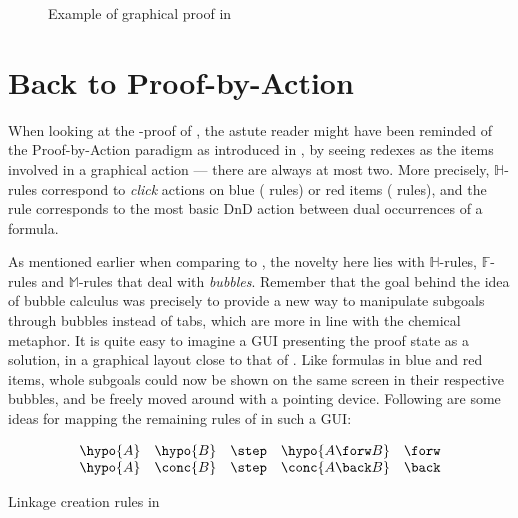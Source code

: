 \begin{figure*}
  
  \caption{Example of graphical proof in }
\end{figure*}

\section{Back to Proof-by-Action}

When looking at the -proof of , the astute reader
might have been reminded of the Proof-by-Action paradigm as introduced in
, by seeing redexes as the items involved in a graphical action ---
there are always at most two. More precisely, $\mathbb{H}$-rules correspond to
\emph{click} actions on blue ({\rnm{\mcirc{-}}} rules) or red items
({\rnm{\mcirc{+}}} rules), and the {} rule corresponds to
the most basic DnD action between dual occurrences of a formula.

As mentioned earlier when comparing  to , the novelty here lies
with $\mathbb{H}$-rules, $\mathbb{F}$-rules and $\mathbb{M}$-rules that deal
with \emph{bubbles}. Remember that the goal behind the idea of bubble calculus
was precisely to provide a new way to manipulate subgoals through bubbles
instead of tabs, which are more in line with the chemical metaphor. It is quite
easy to imagine a GUI presenting the proof state as a solution, in a graphical
layout close to that of . Like formulas in blue and red
items, whole subgoals could now be shown on the same screen in their respective
bubbles, and be freely moved around with a pointing device. Following are some
ideas for mapping the remaining rules of  in such a GUI:

\begin{marginfigure}
  $$
  \begin{array}{rcll}
    \hypo{A}~~~\hypo{B} &\step &\hypo{A \forw B} &\forw \\
    \hypo{A}~~~\conc{B} &\step &\conc{A \back B} &\back \\
  \end{array}
  $$
  \caption{Linkage creation rules in }
\end{marginfigure}



